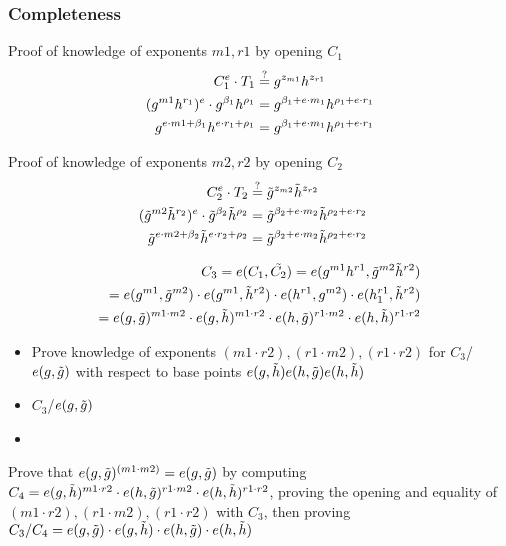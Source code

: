 \newpage
\subsubsection{Completeness}
Proof of knowledge of exponents $m1, r1$ by opening $C_1$
    \begin{align}
    C_1^e \cdot T_1 &\stackrel{?}{=} g^{z_{m1}} h^{z_{r1}} \notag \\
    (g^{m1}h^{r_1})^e \cdot g^{\beta_1}h^{\rho_1} &= g^{\beta_1 + e \cdot m_1} h^{\rho_1 + e \cdot r_1} \notag \\
    g^{e \cdot m1 + \beta_1}h^{e \cdot r_1 + \rho_1} &= g^{\beta_1 + e \cdot m_1} h^{\rho_1 + e \cdot r_1} \notag
    \end{align}

    
Proof of knowledge of exponents $m2, r2$ by opening $C_2$
\begin{align}
    C_2^e \cdot T_2 &\stackrel{?}{=} \tilde{g}^{z_{m2}} \tilde{h}^{z_{r2}} && \label{eq:ver2} \\
    (\tilde{g}^{m2}\tilde{h}^{r_2})^e \cdot \tilde{g}^{\beta_2}\tilde{h}^{\rho_2} &= \tilde{g}^{\beta_2 + e \cdot m_2} \tilde{h}^{\rho_2 + e \cdot r_2} \notag \\
    \tilde{g}^{e \cdot m2 + \beta_2}\tilde{h}^{e \cdot r_2 + \rho_2} &= \tilde{g}^{\beta_2 + e \cdot m_2} \tilde{h}^{\rho_2 + e \cdot r_2} \notag
    \end{align}

    
\begin{align}
    C_3 = e(C_1, \tilde{C_2}) = e(g^{m1} h^{r1}, \tilde{g}^{m2} \tilde{h}^{r2}) \notag \\
    = e(g^{m1}, \tilde{g}^{m2}) \cdot e(g^{m1},\tilde{h}^{r2}) \cdot e(h^{r1}, g^{m2}) \cdot e(h_1^{r1}, \tilde{h}^{r2})  \notag \\
    = e(g, \tilde{g})^{m1\cdot m2} \cdot e(g,\tilde{h})^{m1 \cdot r2} \cdot e(h, \tilde{g})^{r1 \cdot m2} \cdot e(h, \tilde{h})^{r1 \cdot r2}  \notag \\
\end{align}



\begin{itemize}
    \item Prove knowledge of exponents $(m1 \cdot r2), (r1 \cdot m2), (r1 \cdot r2)$ for $C_3$/$e(g,\tilde{g})$  with respect to base points $e(g,\tilde{h}) e(h, \tilde{g}) e(h, \tilde{h})$
    \item $C_3$/$e(g,\tilde{g})$ 
    \item 
\end{itemize}


Prove that $e(g, \tilde{g})^{(m1 \cdot m2)} = e(g, \tilde{g})$ by computing $C_4 = e(g,\tilde{h})^{m1 \cdot r2} \cdot e(h, \tilde{g})^{r1 \cdot m2} \cdot e(h, \tilde{h})^{r1 \cdot r2}$, proving the opening and equality of $(m1 \cdot r2), (r1 \cdot m2), (r1 \cdot r2)$ with $C_3$, then proving $C_3/C_4 = e(g, \tilde{g}) \cdot e(g,\tilde{h}) \cdot e(h, \tilde{g}) \cdot e(h, \tilde{h}) $

